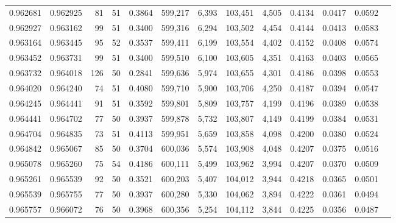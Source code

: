 \begin{tabular}{rrrrrrrrrrrrr}
0.962681 & 0.962925 &    81 &  51 &                                     0.3864 & 599,217 &   6,393 & 103,451 &   4,505 & 0.4134 & 0.0417 & 0.0592 \\
0.962927 & 0.963162 &    99 &  51 &                                     0.3400 & 599,316 &   6,294 & 103,502 &   4,454 & 0.4144 & 0.0413 & 0.0583 \\
0.963164 & 0.963445 &    95 &  52 &                                     0.3537 & 599,411 &   6,199 & 103,554 &   4,402 & 0.4152 & 0.0408 & 0.0574 \\
0.963452 & 0.963731 &    99 &  51 &                                     0.3400 & 599,510 &   6,100 & 103,605 &   4,351 & 0.4163 & 0.0403 & 0.0565 \\
0.963732 & 0.964018 &   126 &  50 &                                     0.2841 & 599,636 &   5,974 & 103,655 &   4,301 & 0.4186 & 0.0398 & 0.0553 \\
0.964020 & 0.964240 &    74 &  51 &                                     0.4080 & 599,710 &   5,900 & 103,706 &   4,250 & 0.4187 & 0.0394 & 0.0547 \\
0.964245 & 0.964441 &    91 &  51 &                                     0.3592 & 599,801 &   5,809 & 103,757 &   4,199 & 0.4196 & 0.0389 & 0.0538 \\
0.964441 & 0.964702 &    77 &  50 &                                     0.3937 & 599,878 &   5,732 & 103,807 &   4,149 & 0.4199 & 0.0384 & 0.0531 \\
0.964704 & 0.964835 &    73 &  51 &                                     0.4113 & 599,951 &   5,659 & 103,858 &   4,098 & 0.4200 & 0.0380 & 0.0524 \\
0.964842 & 0.965067 &    85 &  50 &                                     0.3704 & 600,036 &   5,574 & 103,908 &   4,048 & 0.4207 & 0.0375 & 0.0516 \\
0.965078 & 0.965260 &    75 &  54 &                                     0.4186 & 600,111 &   5,499 & 103,962 &   3,994 & 0.4207 & 0.0370 & 0.0509 \\
0.965261 & 0.965539 &    92 &  50 &                                     0.3521 & 600,203 &   5,407 & 104,012 &   3,944 & 0.4218 & 0.0365 & 0.0501 \\
0.965539 & 0.965755 &    77 &  50 &                                     0.3937 & 600,280 &   5,330 & 104,062 &   3,894 & 0.4222 & 0.0361 & 0.0494 \\
0.965757 & 0.966072 &    76 &  50 &                                     0.3968 & 600,356 &   5,254 & 104,112 &   3,844 & 0.4225 & 0.0356 & 0.0487 \\

\end{tabular}
